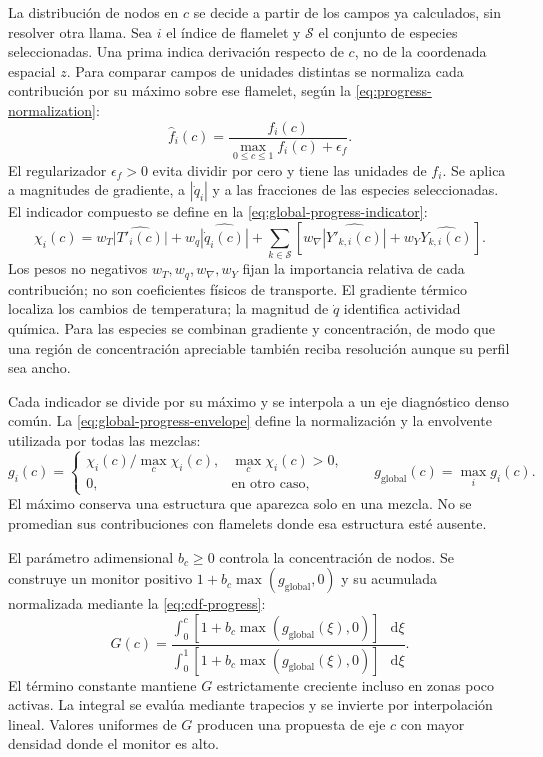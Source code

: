 \documentclass[12pt,a4paper,twoside,openany]{book}
\newcommand{\dd}{\mathop{}\!\mathrm{d}}
\begin{document}
La distribución de nodos en \(c\) se decide a partir de los campos ya
calculados, sin resolver otra llama. Sea \(i\) el índice de flamelet y
\(\mathcal S\) el conjunto de especies seleccionadas. Una prima indica
derivación respecto de \(c\), no de la coordenada espacial \(z\).
Para comparar campos de unidades distintas se normaliza cada contribución
por su máximo sobre ese flamelet, según la \cref{eq:progress-normalization}:
\begin{equation}
 \widehat f_i(c)=\frac{f_i(c)}{\max_{0\leq c\leq1}f_i(c)+\epsilon_f}.
 \label{eq:progress-normalization}
\end{equation}
El regularizador \(\epsilon_f>0\) evita dividir por cero y tiene las unidades
de \(f_i\). Se aplica a magnitudes de gradiente, a \(|\dot q_i|\) y a las
fracciones de las especies seleccionadas. El indicador compuesto se define
en la \cref{eq:global-progress-indicator}:
\begin{equation}
 \chi_i(c)=w_T\widehat{|T'_i(c)|}
       +w_q\widehat{|\dot q_i(c)|}
       +\sum_{k\in\mathcal S}
       \left[w_{\nabla}\widehat{|Y'_{k,i}(c)|}
                    +w_Y\widehat{Y_{k,i}(c)}\right].
 \label{eq:global-progress-indicator}
\end{equation}
Los pesos no negativos \(w_T,w_q,w_{\nabla},w_Y\) fijan la importancia
relativa de cada contribución; no son coeficientes físicos de transporte.
El gradiente térmico localiza los cambios de temperatura; la magnitud de
\(\dot q\) identifica actividad química. Para las especies se combinan
gradiente y concentración, de modo que una región de concentración apreciable
también reciba resolución aunque su perfil sea ancho.

Cada indicador se divide por su máximo y se interpola a un eje diagnóstico
denso común. La \cref{eq:global-progress-envelope} define la normalización
y la envolvente utilizada por todas las mezclas:
\begin{equation}
 g_i(c)=
 \begin{cases}
 \chi_i(c)/\max_c \chi_i(c),&\max_c \chi_i(c)>0,\\
 0,&\text{en otro caso},
 \end{cases}
 \qquad
 g_{\mathrm{global}}(c)=\max_i g_i(c).
 \label{eq:global-progress-envelope}
\end{equation}
El máximo conserva una estructura que aparezca solo en una mezcla.
No se promedian sus contribuciones con flamelets donde esa estructura esté
ausente.

El parámetro adimensional \(b_c\geq0\) controla la concentración de nodos.
Se construye un monitor positivo \(1+b_c\max(g_{\mathrm{global}},0)\)
y su acumulada normalizada mediante la \cref{eq:cdf-progress}:
\begin{equation}
 G(c)=
 \frac{\displaystyle\int_0^c
       [1+b_c\max(g_{\mathrm{global}}(\xi),0)]\,\dd\xi}
      {\displaystyle\int_0^1
       [1+b_c\max(g_{\mathrm{global}}(\xi),0)]\,\dd\xi}.
 \label{eq:cdf-progress}
\end{equation}
El término constante mantiene \(G\) estrictamente creciente incluso en
zonas poco activas. La integral se evalúa mediante trapecios y se invierte
por interpolación lineal. Valores uniformes de \(G\) producen una propuesta
de eje \(c\) con mayor densidad donde el monitor es alto.
\end{document}
